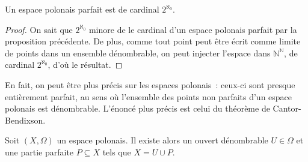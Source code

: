 \begin{corollary}
  Un espace polonais parfait est de cardinal $2^{\aleph_0}$.
\end{corollary}

\begin{proof}
  On sait que $2^{\aleph_0}$ minore de le cardinal d'un espace polonais parfait
  par la proposition précédente. De plus, comme tout point peut être écrit
  comme limite de points dans un ensemble dénombrable, on peut injecter l'espace
  dans $\mathbb N^\mathbb N$, de cardinal $2^{\aleph_0}$, d'où le résultat.
\end{proof}

En fait, on peut être plus précis sur les espaces polonais~: ceux-ci sont
presque entièrement parfait, au sens où l'ensemble des points non parfaits d'un
espace polonais est dénombrable. L'énoncé plus précis est celui du théorème de
Cantor-Bendixson.

\begin{theorem}
  Soit $(X,\Omega)$ un espace polonais. Il existe alors un ouvert dénombrable
  $U\in \Omega$ et une partie parfaite $P\subseteq X$ tels que
  $X = U \cup P$.
\end{theorem}

